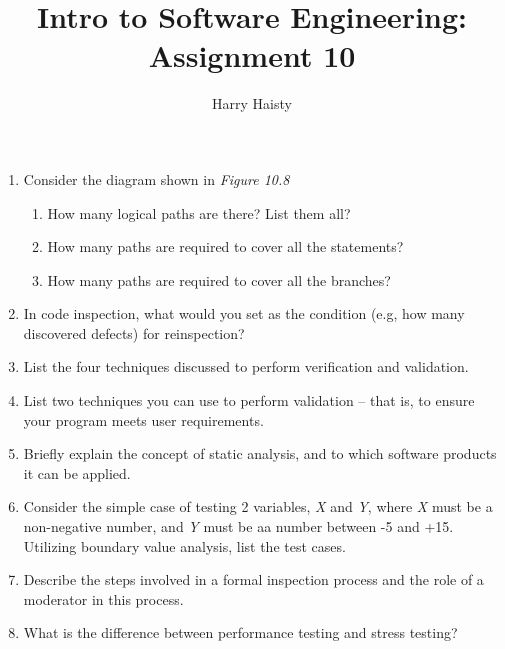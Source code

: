 \documentclass[11pt]{article}
\title{Intro to Software Engineering: Assignment 10}
\author{Harry Haisty}
\begin{document}
    \maketitle
    \begin{enumerate}
        \item Consider the diagram shown in \textit{Figure 10.8}
        \begin{enumerate}
        \item How many logical paths are there? List them all? 
        \item How many paths are required to cover all the statements?
        \item How many paths are required to cover all the branches?
        \end{enumerate}
        
        \item In code inspection, what would you set as the condition (e.g, how many discovered defects) for reinspection?
        
        \item List the four techniques discussed to perform verification and validation.
        
        \item List two techniques you can use to perform validation -- that is, to ensure your program meets user requirements. 
        
        \item Briefly explain the concept of static analysis, and to which software products it can be applied.
        
        \item Consider the simple case of testing 2 variables, \textit{X} and \textit{Y}, where \textit{X} must be a non-negative number, and \textit{Y} must be aa number between -5 and +15. Utilizing boundary value analysis, list the test cases. 
        
        \item Describe the steps involved in a formal inspection process and the role of a moderator in this process.
        
        \item What is the difference between performance testing and stress testing?
        
        
    \end{enumerate}
    
    
\end{document}

